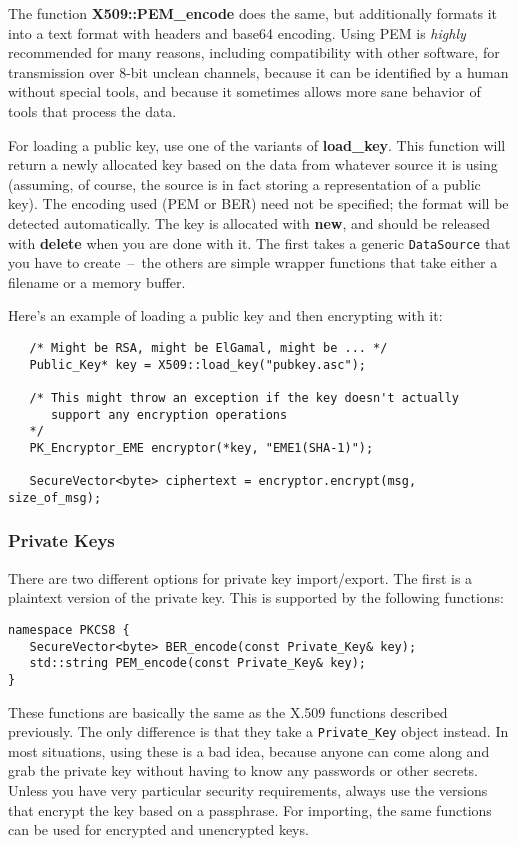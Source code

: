 \documentclass{article}
\newcommand{\function}[1]{\textbf{#1}}
\newcommand{\type}[1]{\texttt{#1}}
\begin{document}
The function \function{X509::PEM\_encode} does the same, but
additionally formats it into a text format with headers and base64
encoding. Using PEM is \emph{highly} recommended for many reasons,
including compatibility with other software, for transmission over
8-bit unclean channels, because it can be identified by a human
without special tools, and because it sometimes allows more sane
behavior of tools that process the data.

For loading a public key, use one of the variants of
\function{load\_key}. This function will return a newly allocated key
based on the data from whatever source it is using (assuming, of
course, the source is in fact storing a representation of a public
key). The encoding used (PEM or BER) need not be specified; the format
will be detected automatically. The key is allocated with
\function{new}, and should be released with \function{delete} when you
are done with it. The first takes a generic \type{DataSource} that you
have to create~--~the others are simple wrapper functions that take
either a filename or a memory buffer.

Here's an example of loading a public key and then encrypting with it:

\begin{verbatim}
   /* Might be RSA, might be ElGamal, might be ... */
   Public_Key* key = X509::load_key("pubkey.asc");

   /* This might throw an exception if the key doesn't actually
      support any encryption operations
   */
   PK_Encryptor_EME encryptor(*key, "EME1(SHA-1)");

   SecureVector<byte> ciphertext = encryptor.encrypt(msg, size_of_msg);
\end{verbatim}

\subsubsection{Private Keys}

There are two different options for private key import/export. The first is a
plaintext version of the private key. This is supported by the following
functions:

\begin{verbatim}
namespace PKCS8 {
   SecureVector<byte> BER_encode(const Private_Key& key);
   std::string PEM_encode(const Private_Key& key);
}
\end{verbatim}

These functions are basically the same as the X.509 functions
described previously. The only difference is that they take a
\type{Private\_Key} object instead. In most situations, using these is
a bad idea, because anyone can come along and grab the private key
without having to know any passwords or other secrets. Unless you have
very particular security requirements, always use the versions that
encrypt the key based on a passphrase. For importing, the same
functions can be used for encrypted and unencrypted keys.
\end{document}
